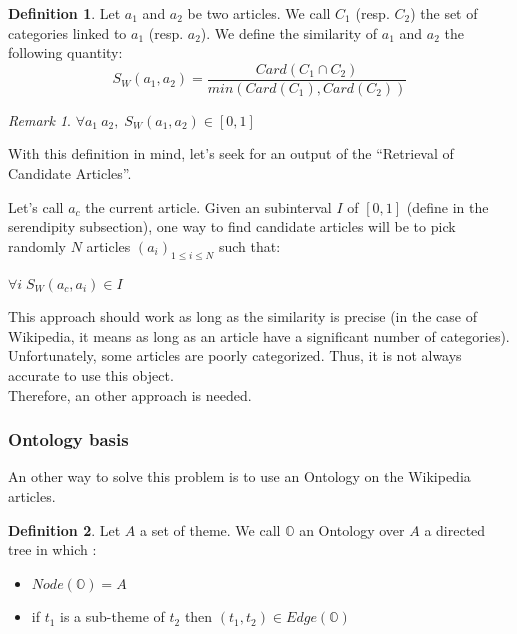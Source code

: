 \documentclass[11pt]{article}
\theoremstyle{plain}
\theoremstyle{definition}
\newtheorem{defn}{Definition}[section]
\theoremstyle{remark}
\newtheorem*{rem}{Remark}
\begin{document}
\vspace*{5mm}
\begin{defn}
  Let $a_1$ and $a_2$ be two articles. We call $C_1$ (resp. $C_2$) the set of categories linked to $a_1$ (resp. $a_2$).
  We define the similarity of $a_1$ and $a_2$ the following quantity:\\
  \begin{equation*}
    S_W(a_1,a_2) = \frac{Card(C_1 \cap C_2)}{min(Card(C_1),Card(C_2))}
  \end{equation*}
\end{defn}

\begin{rem}
  $\forall a_1\: a_2,\; S_W(a_1,a_2) \in [0,1]$
\end{rem}

\vspace*{5mm}
With this definition in mind, let's seek for an output of the ``Retrieval of Candidate Articles''.


Let's call $a_c$ the current article.
Given an subinterval $I$ of $[0,1]$ (define in the serendipity subsection), one way to find candidate articles will be to pick randomly $N$ articles $(a_i)_{1 \leq i \leq N}$ such that:
\begin{center}
  $\forall i \; S_W(a_c,a_i) \in I$
\end{center}

\vspace*{5mm}
This approach should work as long as the similarity is precise (in the case of Wikipedia, it means as long as an article have a significant number of categories). Unfortunately, some articles are poorly categorized. Thus, it is not always accurate to use this object.\\
Therefore, an other approach is needed.






\subsubsection{Ontology basis}

An other way to solve this problem is to use an Ontology on the Wikipedia articles.

\vspace*{5mm}
\begin{defn}
  Let $A$ a set of theme. We call $\mathbb{O}$ an Ontology over $A$ a directed tree in which :
  \begin{itemize}
  \item $ Node(\mathbb{O}) = A$
  \item if $t_1$ is a sub-theme of $t_2$ then $(t_1,t_2) \in Edge(\mathbb{O})$
  \end{itemize}
\end{defn}
\end{document}
